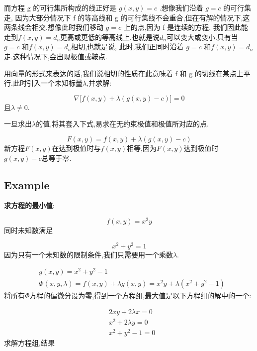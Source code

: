 \documentclass{article}
\begin{document}
而方程 g 的可行集所构成的线正好是 $g ( x, y ) = c$ .想像我们沿着 $g = c$ 的可行集走,
因为大部分情况下 f 的等高线和 g 的可行集线不会重合,但在有解的情况下,这两条线会相交.想像此时我们移动 $g = c$ 上的点,因为 f 是连续的方程,
我们因此能走到$f \left( x, y \right)=d_n$更高或更低的等高线上,也就是说$d_n$可以变大或变小.只有当 $g = c$ 和$f \left( x, y \right)=d_n$相切,也就是说,
此时,我们正同时沿着 $g = c$ 和$f \left( x, y \right)=d_n$走.这种情况下,会出现极值或鞍点.

用向量的形式来表达的话,我们说相切的性质在此意味着 f 和 g 的切线在某点上平行.此时引入一个未知标量$\lambda$,并求解:

$$ \nabla \Big[f \left(x, y \right) + \lambda \left(g \left(x, y \right) - c \right) \Big] = 0 $$
且$\lambda \neq 0$.

一旦求出$\lambda$的值,将其套入下式,易求在无约束极值和极值所对应的点.

$$ F \left( x , y \right)  =  f \left( x , y \right) + \lambda \left( g \left( x , y \right) - c \right) $$
新方程$F(x,y)$在达到极值时与$f(x,y)$相等,因为$F(x,y)$达到极值时$g(x,y)-c$总等于零.

\subsection{Example}
\begin{example}
\textbf{求方程的最小值}:

$$ f(x, y) = x^2 y $$
同时未知数满足

$$ x^2 + y^2 = 1 $$
因为只有一个未知数的限制条件,我们只需要用一个乘数$\lambda$.

$$
\begin{aligned}
		& g (x, y) = x^2 +y^2 -1 \\
		& \Phi (x, y, \lambda) = f(x,y) + \lambda g(x, y) = x^2 y + \lambda (x^2 + y^2 - 1)
\end{aligned}
$$
将所有$\Phi$方程的偏微分设为零,得到一个方程组,最大值是以下方程组的解中的一个:

$$
\begin{aligned}
		& 2 x y + 2 \lambda x = 0 \\
		& x^2 + 2 \lambda y = 0 \\
		& x^2 + y^2 -1 = 0
\end{aligned}
$$
求解方程组,结果
\end{example}
\end{document}
